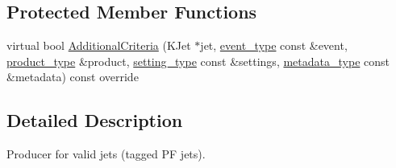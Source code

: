\subsection*{Protected Member Functions}
\begin{DoxyCompactItemize}
\item 
virtual bool \hyperlink{classHttValidTaggedJetsProducer_a73f48f12711a153748ecd9f5da611fb6}{AdditionalCriteria} (KJet $\ast$jet, \hyperlink{classHttValidTaggedJetsProducer_a3bc1d36fed6d4f463a6a31a9d6198e44}{event\_\-type} const \&event, \hyperlink{classHttValidTaggedJetsProducer_a0a3a5df44dc79ee735fb2d118df5e2e9}{product\_\-type} \&product, \hyperlink{classHttValidTaggedJetsProducer_aaf69d5b37684a121c6bf3651ece90d0c}{setting\_\-type} const \&settings, \hyperlink{classHttValidTaggedJetsProducer_afd0b781e5d24d02788c7e29a4634389a}{metadata\_\-type} const \&metadata) const override
\end{DoxyCompactItemize}


\subsection{Detailed Description}
Producer for valid jets (tagged PF jets). 

